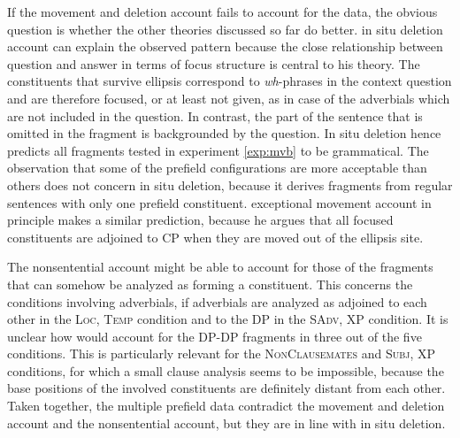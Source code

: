 If the movement and deletion account fails to account for the data, the obvious question is whether the other theories discussed so far do better.  in situ deletion account can explain the observed pattern because the close relationship between question and answer in terms of focus structure is central to his theory. The constituents that survive ellipsis correspond to \textit{wh}-phrases in the context question and are therefore focused, or at least not given, as in case of the adverbials which are not included in the question. In contrast, the part of the sentence that is omitted in the fragment is backgrounded by the question. In situ deletion hence predicts all fragments tested in experiment \ref{exp:mvb} to be grammatical. The observation that some of the prefield configurations are more acceptable than others does not concern in situ deletion, because it derives fragments from regular sentences with only one prefield constituent.  exceptional movement account in principle makes a similar prediction, because he argues that all focused constituents are adjoined to CP when they are moved out of the ellipsis site.

The nonsentential account might be able to account for those of the fragments that can somehow be analyzed as forming a constituent. This concerns the conditions involving adverbials, if adverbials are analyzed as adjoined to each other in the \textsc{Loc, Temp} condition and to the DP in the \textsc{SAdv, XP} condition. It is unclear how \citet{barton.progovac2005} would account for the DP-DP fragments in three out of the five conditions. This is particularly relevant for the \textsc{NonClausemates} and \textsc{Subj, XP} conditions, for which a small clause analysis seems to be impossible, because the base positions of the involved constituents are definitely distant from each other. Taken together, the multiple prefield data contradict the movement and deletion account and the nonsentential account, but they are in line with in situ deletion.


